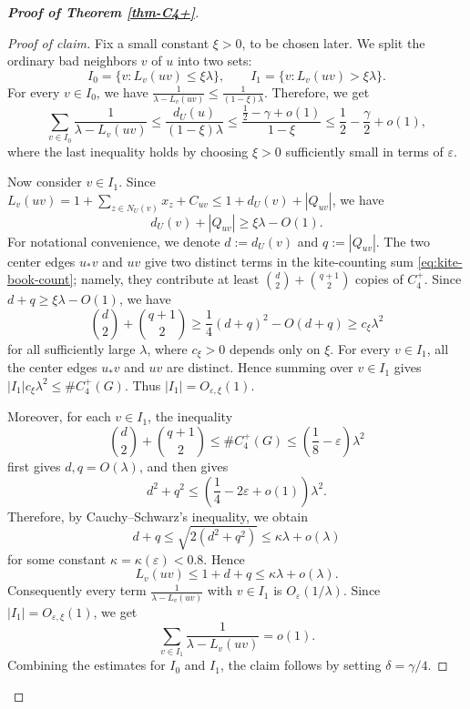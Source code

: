 \documentclass[11pt,a4paper]{article}
\theoremstyle{definition}
\theoremstyle{plain}
\renewcommand{\le}{\leqslant}
\renewcommand{\ge}{\geqslant}
\begin{document}
\begin{proof}[{\bf Proof of Theorem \ref{thm-C4+}}]
\begin{proof}[Proof of claim]
Fix a small constant \(\xi>0\), to be chosen later. We split the ordinary bad
neighbors \(v\) of \(u\) into two sets:
\[
        I_0=\{v:L_v(uv)\le \xi\lambda\},
        \qquad
        I_1=\{v:L_v(uv)>\xi\lambda\}.
\]
For every \(v\in I_0\), we have 
$  \frac{1}{\lambda-L_v(uv)}
        \le
        \frac{1}{(1-\xi)\lambda}$. 
Therefore, we get 
\[
        \sum_{v\in I_0}\frac{1}{\lambda-L_v(uv)}
        \le
        \frac{d_U(u)}{(1-\xi)\lambda}
        \le
        \frac{\frac12-\gamma+o(1)}{1-\xi} \le   \frac12-\frac{\gamma}{2}+o(1),
\]
where the last inequality holds by 
choosing \(\xi>0\) sufficiently small in terms of \(\varepsilon\). 

Now consider \(v\in I_1\).  Since
$   L_v(uv)=1+ \sum_{z\in N_U(v)}x_z +C_{uv}\le 1+d_U(v)+|Q_{uv}|$, 
we have
\[
        d_U(v)+|Q_{uv}| \ge \xi\lambda-O(1).
\]
For notational convenience, we denote 
$ d:=d_U(v)$ and  $q:=|Q_{uv}|$. 
The two center edges \(u_*v\) and \(uv\) give two distinct terms in the
kite-counting sum \eqref{eq:kite-book-count}; namely, they contribute at least
$  {d\choose2}+{q+1\choose2}$ 
copies of $C_4^+$.  Since \(d+q\ge\xi\lambda-O(1)\), we have
\[
        {d\choose2}+{q+1\choose2}
        \ge
        \frac14(d+q)^2-O(d+q)
        \ge
        c_\xi\lambda^2
\]
for all sufficiently large \(\lambda\), where \(c_\xi>0\) depends only on
\(\xi\).  For every $v\in I_1$, all the center edges \(u_*v\) and \(uv\) are
distinct.  Hence summing over \(v\in I_1\) gives
$  |I_1|c_\xi\lambda^2\le  \texttt{\#}{C_4^+}(G)$.
Thus \(|I_1|=O_{\varepsilon,\xi}(1)\).

Moreover, for each \(v\in I_1\), the inequality
\[
        {d\choose2}+{q+1\choose2}
        \le  \texttt{\#}{C_4^+}(G)
        \le
        \left(\frac18-\varepsilon\right)\lambda^2
\]
first gives \(d,q=O(\lambda)\), and then gives
\[
        d^2+q^2
        \le
        \left(\frac14-2\varepsilon+o(1)\right)\lambda^2.
\]
Therefore, by Cauchy--Schwarz's inequality, we obtain 
\[
        d+q
        \le
        \sqrt{2(d^2+q^2)}
        \le
        \kappa\lambda+o(\lambda)
\]
for some constant \(\kappa=\kappa(\varepsilon)<0.8\).  Hence
\[
        L_v(uv)\le 1+d+q\le \kappa\lambda+o(\lambda).
\]
Consequently every term $\frac{1}{\lambda - L_v(uv)}$ with \(v\in I_1\) is \(O_\varepsilon(1/\lambda)\).
Since \(|I_1|=O_{\varepsilon,\xi}(1)\), we get
\[
        \sum_{v\in I_1}\frac{1}{\lambda-L_v(uv)}=o(1).
\]
Combining the estimates for \(I_0\) and \(I_1\), the claim follows by setting \(\delta=\gamma/4\).
\end{proof}


\end{proof}
\end{document}
